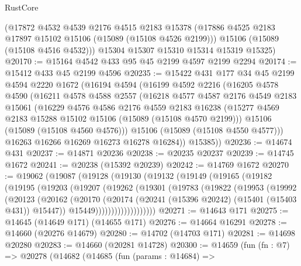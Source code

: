 \begin{lexlean}{RustCore}
\begin{coremodule}
      (@17872
        @4532
        @4539
        @2176
        @4515
        @2183
        @15378
        (@17886 @4525 @2183 @17897 @15102 @15106 (@15089 (@15108 @4526 @2199)))
        @15106
        (@15089 (@15108 @4516 @4532)))
      @15304
      @15307
      @15310
      @15314
      @15319
      @15325)
@20170 := @15164 @4542 @433 @95 @45 @2199 @4597 @2199 @2294
@20174 := @15412 @433 @45 @2199 @4596
@20235 := @15422
    @431
    @177
    @34
    @45
    @2199
    @4594
    @2220
    @1672
    (@16194
      @4594
      (@16199
        @4592
        @2216
        (@16205
          @4578
          @4590
          (@16211
            @4578
            @4588
            @2557
            (@16218
              @4577
              @4587
              @2176
              @4549
              @2183
              @15061
              (@16229
                @4576
                @4586
                @2176
                @4559
                @2183
                @16238
                (@15277 @4569 @2183 @15288 @15102 @15106 (@15089 (@15108 @4570 @2199)))
                @15106
                (@15089 (@15108 @4560 @4576)))
              @15106
              (@15089 (@15108 @4550 @4577)))
            @16263
            @16266
            @16269
            @16273
            @16278
            @16284))
        @15385))
@20236 := @14674 @431
@20237 := @14871 @20236
@20238 := @20235 @20237
@20239 := @14745 @1672
@20241 := @20238 (@15392 @20239)
@20242 := @14769 @1672
@20270 := @19062
    (@19087
      (@19128
        (@19130
          (@19132
            (@19149
              (@19165
                (@19182
                  (@19195
                    (@19203
                      (@19207
                        (@19262
                          (@19301
                            (@19783
                              (@19822
                                (@19953
                                  (@19992
                                    (@20123
                                      (@20162
                                        (@20170
                                          (@20174
                                            (@20241 (@15396 @20242) (@15401 (@15403 @431)) @15447))
                                          @15449)))))))))))))))))))
@20271 := @14643 @171
@20275 := @14645 (@14649 @171) (@14655 @171)
@20276 := @14664 @16291
@20278 := @14660 (@20276 @14679)
@20280 := @14702 (@14703 @171)
@20281 := @14698 @20280
@20283 := @14660 (@20281 @14728)
@20300 := @14659
    (fun (fn : @7) =>
    @20278
      (@14682
        (@14685
          (fun (params : @14684) =>

\end{coremodule}
\end{lexlean}
